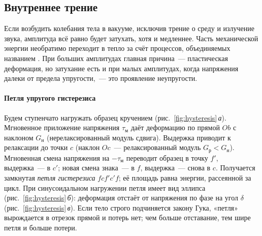 \subsection{Внутреннее трение}\label{ssec:internal-friction}

Если возбудить колебания тела в вакууме, исключив трение о среду и
излучение звука, амплитуда всё равно будет затухать, хотя и медленнее.
Часть механической энергии необратимо переходит в тепло за счёт
процессов, объединяемых названием . При больших
амплитудах главная причина~— пластическая деформация, но затухание есть и
при малых амплитудах, когда напряжения далеки от предела упругости,~— это
проявление неупругости.

\paragraph{Петля упругого гистерезиса}
Будем ступенчато нагружать образец кручением
(рис.~\ref{fig:hysteresis}\,\textit{а}). Мгновенное приложение напряжения
$\tau_\text{м}$ даёт деформацию по прямой $Ob$ с наклоном $G_\text{н}$
(нерелаксированный модуль сдвига). Выдержка приводит к релаксации до
точки $c$ (наклон $Oc$~— релаксированный модуль $G_\text{р}<G_\text{н}$).
Мгновенная смена напряжения на $-\tau_\text{м}$ переводит образец в точку
$f'$, выдержка~— в $c'$; новая смена знака~— в $f$, выдержка~— снова в
$c$. Получается замкнутая \emph{петля гистерезиса} $fcf'c'f$; её площадь
равна энергии, рассеянной за цикл. При синусоидальном нагружении петля
имеет вид эллипса (рис.~\ref{fig:hysteresis}\,\textit{б}): деформация
отстаёт от напряжения по фазе на угол $\delta$
(рис.~\ref{fig:hysteresis}\,\textit{в}). Если тело строго подчиняется
закону Гука, «петля» вырождается в отрезок прямой и потерь нет; чем
больше отставание, тем шире петля и больше потери.

